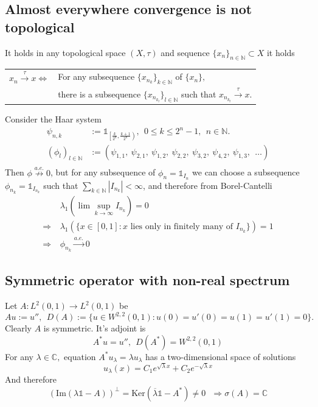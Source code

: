 \documentclass[12pt,a4paper]{article}
\renewcommand\:{\colon}
\renewcommand{\Im}{\mathrm{Im}}
\newcommand{\Ker}{\mathrm{Ker}}
\begin{document}
\subsection{Almost everywhere convergence is not topological}
It holds in any topological space $(X,\tau)$ and sequence $\{x_n\}_{n\in \mathbb{N}}\subset X$ it holds
\begin{center}
	\begin{tabular}{rl}
		$x_n\stackrel{\tau}{\to}x \iff$ &For any subsequence $\{x_{n_k}\}_{k\in \mathbb{N}}$ of $\{x_n\},$ \\ &there is a subsequence $\{x_{n_{k_l}}\}_{l\in \mathbb{N}}$ such that $x_{n_{k_l}}\stackrel{\tau}{\to}x.$
	\end{tabular}
\end{center}
Consider the Haar system
\begin{align*}
	\psi_{n,k}&:= \mathbb{1}_{\left[\textstyle\frac{k}{2^{n}},\textstyle\frac{k+1}{2^{n}}\right)}, \ \ 0\leq k\leq 2^{n}-1, \ \ n\in \mathbb{N}.\\
	(\phi_l)_{l\in \mathbb{N}} &:= (\psi_{1,1},\ \psi_{2,1},\ \psi_{1,2},\ \psi_{2,2},\ \psi_{3,2},\ \psi_{4,2},\ \psi_{1,3},\ \ \hdots) \\
\end{align*}
Then $\phi \stackrel{a.e.}{\not\to} 0$, but for any subsequence of $\phi_n=\mathbb{1}_{I_n}$ we can choose a subsequence $\phi_{n_k}=\mathbb{1}_{I_{n_k}}$ such that
$\sum_{k\in \mathbb{N}}|I_{n_k}|< \infty$, and therefore from Borel-Cantelli
\begin{align*}
	&\lambda_1(\lim\sup_{k\to \infty}I_{n_k})=0\\
	\Rightarrow \ &\lambda_1(\{x\in [0,1]\: x \text{ lies only in finitely many of } I_{n_k}\})=1 \\
	\Rightarrow \ &\phi_{n_k}\stackrel{a.e.}{\to} 0
\end{align*}

\subsection{Symmetric operator with non-real spectrum}
Let $A\: L^{2}(0,1)\to L^{2}(0,1)$ be
\begin{equation*}
	Au := u'', \ \ D(A):=\{u\in W^{2,2}(0,1)\colon u(0)=u'(0)=u(1)=u'(1)=0\}.
\end{equation*}
Clearly $A$ is symmetric. It's adjoint is
\begin{equation*}
	A^{*}u = u'', \ \ D(A^{*})=W^{2,2}(0,1)
\end{equation*}
For any $\lambda\in \mathbb{C},$ equation $A^{*}u_{\lambda}=\lambda u_{\lambda}$ has a two-dimensional space of solutions
\begin{equation*}
	u_{\lambda}(x)=C_1e^{\sqrt{\lambda}x}+C_2e^{-\sqrt{\lambda}x }
\end{equation*}
And therefore
\begin{equation*}
	\left(\Im(\lambda \mathbb{1}-A)\right)^{\perp}=\Ker(\overline{\lambda}\mathbb{1}-A^{*})\neq 0 \ \ \ \Rightarrow \sigma(A)=\mathbb{C}
\end{equation*}
\end{document}

